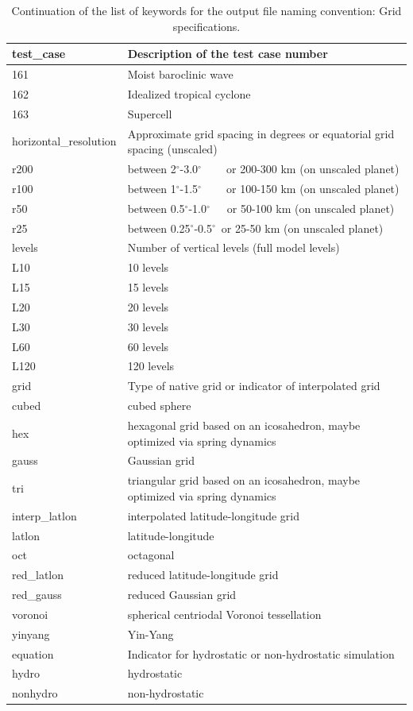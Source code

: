 \documentclass[times,doublespace]{fldauth}
\newcommand\T{\rule{0pt}{2.6ex}}
\newcommand\B{\rule[-1.2ex]{0pt}{0pt}}
\begin{document}
\begin{table}[h]
\caption{Continuation of the list of keywords for the output file naming convention: Grid specifications.} \label{tab:keywordsgrid}
\begin{tabular*}{\textwidth}{@{\extracolsep{\fill}}ll}
\hline 
test\_case \T \B & Description of the test case number \\  \hline 
161 \T& Moist baroclinic wave \\
162 & Idealized tropical cyclone \\
163 & Supercell \\ 
horizontal\_resolution \T \B & Approximate grid spacing in degrees or equatorial grid spacing (unscaled)\\ \hline 
r200 \T & between 2$^\circ$-3.0$^\circ\quad\;\;\,\,$  or 200-300 km (on unscaled planet)\\
r100 & between 1$^\circ$-1.5$^\circ\quad\;\;\,\,$ or 100-150 km (on unscaled planet)\\
r50 & between 0.5$^\circ$-1.0$^\circ \quad\,$ or 50-100 km (on unscaled planet)\\
r25 \B& between 0.25$^\circ$-0.5$^\circ\,$ or 25-50 km (on unscaled planet)\\  \hline
levels \T \B & Number of vertical levels (full model levels)\\  \hline
L10  \T& 10 levels \\
L15 & 15 levels \\
L20 & 20 levels \\
L30 & 30 levels \\
L60 & 60 levels \\
L120 \B & 120 levels \\
\hline 
grid \T \B& Type of native grid or indicator of interpolated grid \\ \hline
cubed \T & cubed sphere \\
hex & hexagonal grid based on an icosahedron, maybe optimized via spring dynamics\\
gauss & Gaussian grid \\
tri & triangular grid based on an icosahedron, maybe optimized via spring dynamics\\
interp\_latlon & interpolated latitude-longitude grid \\
latlon & latitude-longitude \\
oct & octagonal \\
red\_latlon & reduced latitude-longitude grid \\
red\_gauss & reduced Gaussian grid \\
voronoi & spherical centriodal Voronoi tessellation \\
yinyang \B & Yin-Yang \\ \hline
equation \T \B & Indicator for hydrostatic or non-hydrostatic simulation \\  \hline
hydro  \T & hydrostatic \\
nonhydro  \B & non-hydrostatic \\
\hline
\end{tabular*}
\end{table}
\end{document}
